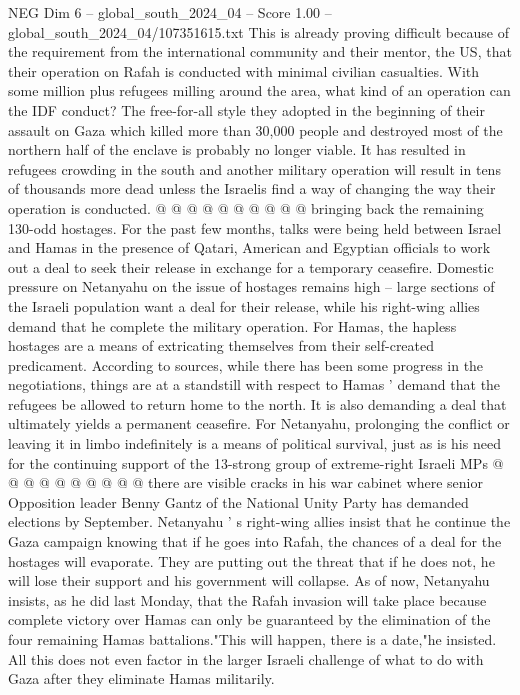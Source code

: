 \begin{textsample}{NEG Dim 6 – global\_south\_2024\_04 – Score 1.00 – global\_south\_2024\_04/107351615.txt}
This is already proving difficult because of the requirement from the international community and their mentor, the US, that their operation on Rafah is conducted with minimal civilian casualties.
With some million plus refugees milling around the area, what kind of an operation can the IDF conduct?
The free-for-all style they adopted in the beginning of their assault on Gaza which killed more than 30,000 people and destroyed most of the northern half of the enclave is probably no longer viable.
It has resulted in refugees crowding in the south and another military operation will result in tens of thousands more dead unless the Israelis find a way of changing the way their operation is conducted. @ @ @ @ @ @ @ @ @ @ bringing back the remaining 130-odd hostages.
For the past few months, talks were being held between Israel and Hamas in the presence of Qatari, American and Egyptian officials to work out a deal to seek their release in exchange for a temporary ceasefire.
Domestic pressure on Netanyahu on the issue of hostages remains high -- large sections of the Israeli population want a deal for their release, while his right-wing allies demand that he complete the military operation.
For Hamas, the hapless hostages are a means of extricating themselves from their self-created predicament.
According to sources, while there has been some progress in the negotiations, things are at a standstill with respect to Hamas ' demand that the refugees be allowed to return home to the north.
It is also demanding a deal that ultimately yields a permanent ceasefire.
For Netanyahu, prolonging the conflict or leaving it in limbo indefinitely is a means of political survival, just as is his need for the continuing support of the 13-strong group of extreme-right Israeli MPs @ @ @ @ @ @ @ @ @ @ there are visible cracks in his war cabinet where senior Opposition leader Benny Gantz of the National Unity Party has demanded elections by September.
Netanyahu ' s right-wing allies insist that he continue the Gaza campaign knowing that if he goes into Rafah, the chances of a deal for the hostages will evaporate.
They are putting out the threat that if he does not, he will lose their support and his government will collapse.
As of now, Netanyahu insists, as he did last Monday, that the Rafah invasion will take place because complete victory over Hamas can only be guaranteed by the elimination of the four remaining Hamas battalions."This will happen, there is a date,"he insisted.
All this does not even factor in the larger Israeli challenge of what to do with Gaza after they eliminate Hamas militarily.

\end{textsample}
